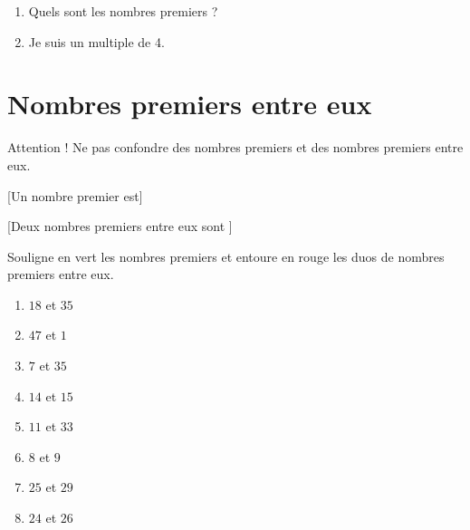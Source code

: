 \documentclass[../../syllabus_2.tex]{subfiles}
\begin{document}
\begin{enumerate}[itemsep=1cm]
    \item Quels sont les nombres premiers  ?

    \item Je suis un multiple de 4.
\end{enumerate}

\vfil

\section{Nombres premiers entre eux}

Attention ! Ne pas confondre des nombres premiers et des nombres premiers entre eux.

[Un nombre premier est] %
\exemples 

\vfil

[Deux nombres premiers entre eux sont ]%
\exemples

\vfil

\begin{exercise}
    Souligne en vert les nombres premiers et entoure en rouge les duos de nombres premiers entre eux. 
    \begin{enumerate}[cols=4, label= ]
        \item \(18 \) et \( 35\)
        \item \(47 \) et \( 1\)
        \item \(7 \) et \( 35\)
        \item \(14 \) et \( 15\)
        \item \(11 \) et \( 33\)
        \item \(8 \) et \( 9 \)
        \item \(25 \) et \( 29\)
        \item \(24 \) et \( 26\)
    \end{enumerate}
\end{exercise}
\end{document}
